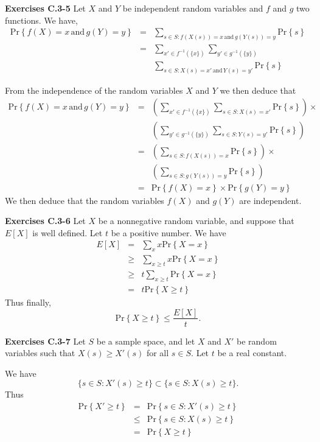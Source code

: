 \documentclass[a4paper,12pt]{article}
\newcommand{\newpar}[1]
{\bigskip \noindent \textbf{Exercises #1} \newline}
\newcommand{\prob}[1]{\mathrm{Pr}\left\{ #1 \right\}}
\begin{document}
\newpar{C.3-5}
Let $X$ and $Y$ be independent random variables and $f$ and $g$ two
functions.   We have,
\begin{eqnarray*}
    \prob{f(X) = x\,\mbox{and}\,g(Y) = y} &=& \sum_{s \in S: f(X(s)) =
     x\,\mbox{and}\,g(Y(s)) = y}\prob{s} \\
    &=& \sum_{x' \in f^{-1}\left(\{x\}\right)} \sum_{y' \in
      g^{-1}\left(\{y\}\right)} \\ && \sum_{s \in S: X(s) =
      x'\,\mbox{and}\,Y(s) = y'} \prob{s}
\end{eqnarray*}

From the independence of the random variables $X$ and $Y$ we then
deduce that
\begin{eqnarray*}
  \prob{f(X) = x\,\mbox{and}\,g(Y) = y} &=& \left( \sum_{x' \in
    f^{-1}\left(\{x\}\right)} \sum_{s \in S: X(s) = x'} \prob{s}
  \right) \times \\
  && \left( \sum_{y' \in
    g^{-1}\left(\{y\}\right)} \sum_{s \in S: Y(s) = y'} \prob{s}
  \right) \\
  &=& \left( \sum_{s \in S: f(X(s)) = x} \prob{s} \right) \times \\ &&
  \left( \sum_{s \in S: g(Y(s)) = y} \prob{s} \right) \\
  &=& \prob{f(X) =  x} \times \prob{g(Y) = y}
\end{eqnarray*}
We then deduce that the random variables $f(X)$ and $g(Y)$ are
independent.

\newpar{C.3-6}
Let $X$ be a nonnegative random variable, and suppose that $E[X]$ is
well defined.  Let $t$ be a positive number.  We have
\begin{eqnarray*}
  E[X] &=& \sum_x x \prob{X=x} \\
  &\ge& \sum_{x \ge t} x \prob{X=x} \\
  &\ge& t \sum_{x \ge t} \prob{X=x} \\
  &=& t \prob{X \ge t}
\end{eqnarray*}
Thus finally,
\[ \prob{X \ge t} \le \frac{E[X]}{t}.\]

\newpar{C.3-7}
Let $S$ be a sample space, and let $X$ and $X'$ be random variables
such that $X(s) \ge X'(s)$ for all $s \in S$.   Let $t$ be a real
constant.

We have
\[ \{ s \in S: X'(s) \ge t \} \subset \{ s \in S: X(s) \ge t \}.\]
Thus
\begin{eqnarray*}
  \prob{X' \ge t} &=& \prob{s \in S: X'(s) \ge t} \\
  &\le& \prob{s \in S: X(s) \ge t} \\
  &=& \prob{X \ge t}
\end{eqnarray*}
\end{document}
